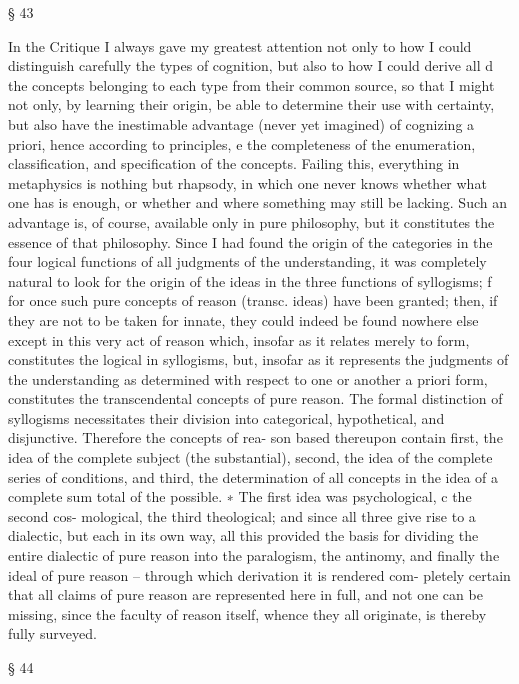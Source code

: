 § 43

In the Critique I always gave my greatest attention not only to how I
could distinguish carefully the types of cognition, but also to how
I could derive all d the concepts belonging to each type from their
common source, so that I might not only, by learning their origin, be
able to determine their use with certainty, but also have the inestimable
advantage (never yet imagined) of cognizing a priori, hence according
to principles, e the completeness of the enumeration, classiﬁcation, and
speciﬁcation of the concepts. Failing this, everything in metaphysics
is nothing but rhapsody, in which one never knows whether what one
has is enough, or whether and where something may still be lacking.
Such an advantage is, of course, available only in pure philosophy, but
it constitutes the essence of that philosophy.
Since I had found the origin of the categories in the four logical
functions of all judgments of the understanding, it was completely
natural to look for the origin of the ideas in the three functions of
syllogisms; f for once such pure concepts of reason (transc. ideas) have
been granted; then, if they are not to be taken for innate, they could
indeed be found nowhere else except in this very act of reason which,
insofar as it relates merely to form, constitutes the logical in syllogisms,
but, insofar as it represents the judgments of the understanding as
determined with respect to one or another a priori form, constitutes the
transcendental concepts of pure reason.
The formal distinction of syllogisms necessitates their division into
categorical, hypothetical, and disjunctive. Therefore the concepts of rea-
son based thereupon contain ﬁrst, the idea of the complete subject (the
substantial), second, the idea of the complete series of conditions, and
third, the determination of all concepts in the idea of a complete sum
total of the possible. ∗ The ﬁrst idea was psychological, c the second cos-
mological, the third theological; and since all three give rise to a dialectic,
but each in its own way, all this provided the basis for dividing the entire
dialectic of pure reason into the paralogism, the antinomy, and ﬁnally
the ideal of pure reason – through which derivation it is rendered com-
pletely certain that all claims of pure reason are represented here in full,
and not one can be missing, since the faculty of reason itself, whence
they all originate, is thereby fully surveyed.

§ 44

